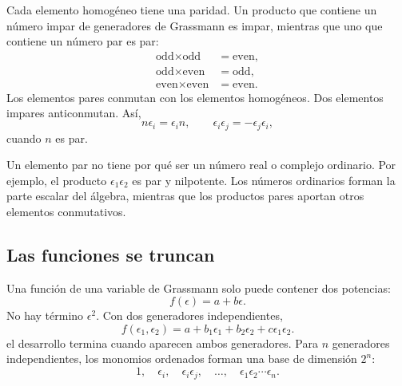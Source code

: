 Cada elemento homogéneo tiene una paridad. Un producto que contiene un número impar de generadores de Grassmann es impar, mientras que uno que contiene un número par es par:
\begin{align}
\text{odd}\times\text{odd}&=\text{even},\\
\text{odd}\times\text{even}&=\text{odd},\\
\text{even}\times\text{even}&=\text{even}.
\end{align}
Los elementos pares conmutan con los elementos homogéneos. Dos elementos impares anticonmutan. Así,
\begin{equation}
n\epsilon_i=\epsilon_i n,
\qquad
\epsilon_i\epsilon_j=-\epsilon_j\epsilon_i,
\end{equation}
cuando \(n\) es par.

Un elemento par no tiene por qué ser un número real o complejo ordinario. Por ejemplo, el producto
\(\epsilon_1\epsilon_2\) es par y nilpotente. Los números ordinarios forman la parte escalar del álgebra, mientras que los productos pares aportan otros elementos conmutativos.

\begin{classroomqa}
\end{classroomqa}

\subsection{Las funciones se truncan}

Una función de una variable de Grassmann solo puede contener dos potencias:
\begin{equation}
f(\epsilon)=a+b\epsilon.
\end{equation}
No hay término \(\epsilon^2\). Con dos generadores independientes,
\begin{equation}
f(\epsilon_1,\epsilon_2)
=a+b_1\epsilon_1+b_2\epsilon_2+c\epsilon_1\epsilon_2.
\end{equation}
el desarrollo termina cuando aparecen ambos generadores. Para \(n\) generadores independientes, los monomios ordenados forman una base de dimensión \(2^n\):
\begin{equation}
1,\quad
\epsilon_i,\quad
\epsilon_i\epsilon_j,\quad
\ldots,\quad
\epsilon_1\epsilon_2\cdots\epsilon_n.
\end{equation}

